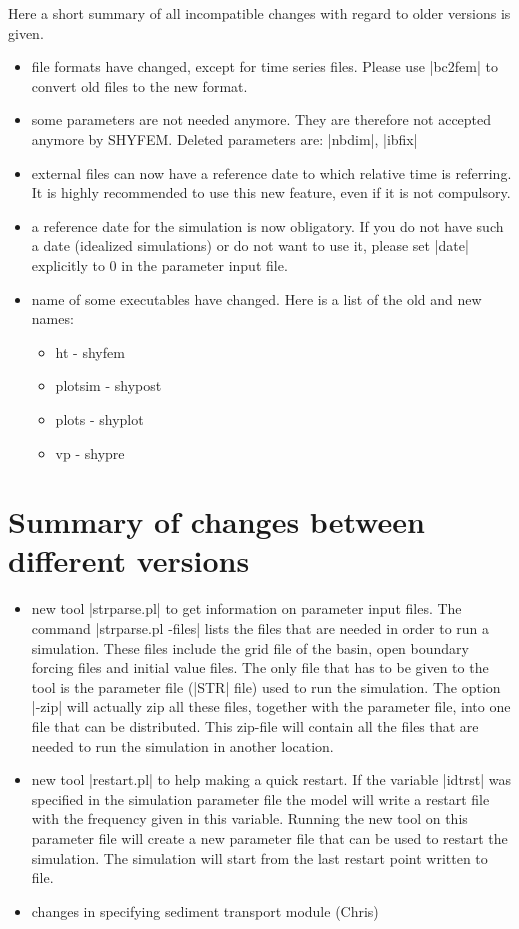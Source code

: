 \documentclass[12pt,draft]{article}
\newcommand{\shyfem}{SHYFEM}
\begin{document}
Here a short summary of all incompatible changes with
regard to older versions is given.

\begin{itemize}
\item file formats have changed, except for time series files. Please use |bc2fem| to convert old files to the new format.
\item some parameters are not needed anymore. They are therefore not accepted anymore by \shyfem. Deleted parameters
are: |nbdim|, |ibfix|
\item external files can now have a reference date to which relative
time is referring. It is highly recommended to use this new feature,
even if it is not compulsory.
\item a reference date for the simulation is now obligatory. If
you do not have such a date (idealized simulations) or do
not want to use it, please set |date| explicitly to 0 in the parameter
input file.
\item name of some executables have changed. Here is a list
of the old and new names:
\begin{itemize}
\item ht - shyfem
\item plotsim - shypost
\item plots - shyplot
\item vp - shypre
\end{itemize}

\end{itemize}

\section{Summary of changes between different versions}

\begin{itemize}
\item new tool |strparse.pl| to get information on parameter input files.
The command |strparse.pl -files| lists the files that are needed
in order to run a simulation. These files include the grid file
of the basin, open boundary forcing files and initial value files.
The only file that has to be given to the tool is the parameter
file (|STR| file) used to run the simulation.
The option |-zip| will actually zip all these files, together with the
parameter file, into one file that can be distributed. This zip-file
will contain all the files that are needed to run the simulation
in another location.
\item new tool |restart.pl| to help making a quick restart. If the variable
|idtrst| was specified in the simulation parameter file the model
will write a restart file with the frequency given in this variable.
Running the new tool on this parameter file will create a new
parameter file that can be used to restart the simulation. The
simulation will start from the last restart point written to file.
\item changes in specifying sediment transport module (Chris)


\end{itemize}
\end{document}
